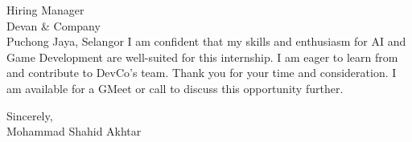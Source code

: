 \documentclass[10.5pt]{letter}
\begin{document}
\begin{letter}{Hiring Manager\\Devan \& Company\\Puchong Jaya, Selangor}
\vspace{0.5cm}
I am confident that my skills and enthusiasm for AI and Game Development are well-suited for this internship. I am eager to learn from and contribute to DevCo's team. Thank you for your time and consideration. I am available for a GMeet or call to discuss this opportunity further.

\vspace{0.5cm}

\begin{flushleft}
\vspace{0.3cm}
Sincerely,\\[2ex]
Mohammad Shahid Akhtar
\end{flushleft}

\end{letter}
\end{document}
